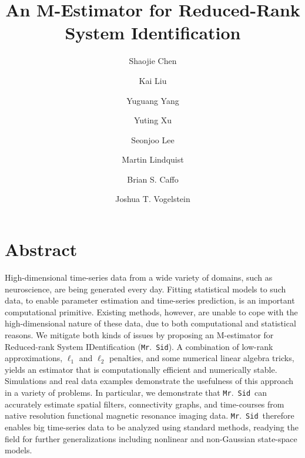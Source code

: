 \documentclass[fleqn,12pt]{article}
\newcommand{\mrsid}{{\sc \texttt{Mr}.~\texttt{Sid}}}
\begin{document}
\title{An M-Estimator for Reduced-Rank
System Identification
}
%

\author[a]{Shaojie Chen}
\author[b]{Kai Liu}
\author[c]{Yuguang Yang}
\author[a]{Yuting Xu}
\author[d]{Seonjoo Lee}
\author[a]{Martin Lindquist}
\author[a]{Brian S. Caffo}
\author[e,f]{Joshua T. Vogelstein}
\date{}
\maketitle
\section*{Abstract}
High-dimensional time-series data from a wide variety of domains, such as neuroscience, are being generated every day. Fitting statistical models to such data, to enable parameter estimation and time-series prediction, is an important computational primitive. Existing methods, however, are unable to cope with the high-dimensional nature of these data, due to both computational and statistical reasons.  We mitigate both kinds of issues by proposing an M-estimator for Reduced-rank System IDentification (\mrsid). A combination of low-rank approximations, $\ell_1$ and $\ell_2$ penalties, and some numerical linear algebra tricks, yields an estimator that is computationally efficient and numerically stable.  Simulations and real data examples demonstrate the usefulness of this approach in a variety of problems.  In particular, we demonstrate that \mrsid~can accurately estimate spatial filters, connectivity graphs, and time-courses from native resolution functional magnetic resonance imaging data. \mrsid~therefore enables big time-series data to be analyzed using standard methods, readying the field for further generalizations including nonlinear and non-Gaussian state-space models.
\end{document}
